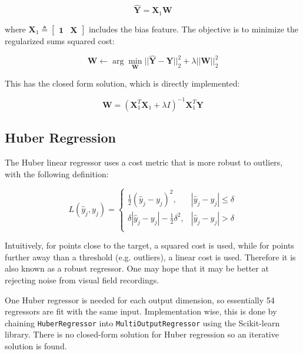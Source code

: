 \begin{equation}
\hat{\mathbf{Y}} = \mathbf{X}_1\mathbf{W}
\end{equation}

where $\mathbf{X}_1\triangleq\begin{bmatrix}\mathbf{1} & \mathbf{X} \end{bmatrix}$ includes the bias feature. The objective is to minimize the regularized sums squared cost:

\begin{equation}
\mathbf{W} \leftarrow \arg \min_{\mathbf{W}} ||\hat{\mathbf{Y}} - \mathbf{Y}||^2_2 + \lambda ||\mathbf{W}||^2_2
\end{equation}

This has the closed form solution, which is directly implemented:

\begin{equation}
\mathbf{W} = \left(
\mathbf{X}_1^T \mathbf{X}_1 + \lambda I
\right)^{-1}
\mathbf{X}_1^T \mathbf{Y}
\end{equation}

\subsection{Huber Regression}

The Huber linear regressor uses a cost metric that is more robust to outliers, with the following definition:

\begin{equation}
L(\hat{y}_j, y_j) = \left\{\begin{array}{lr}
\frac{1}{2}(\hat{y}_j - y_j)^2, & |\hat{y}_j - y_j| \leq \delta\\
\delta|\hat{y}_j - y_j| - \frac{1}{2} \delta^2, & |\hat{y}_j - y_j| > \delta\\
\end{array}
\right.
\end{equation}

Intuitively, for points close to the target, a squared cost is used, while for points further away than a threshold (e.g. outliers), a linear cost is used. Therefore it is also known as a robust regressor. One may hope that it may be better at rejecting noise from visual field recordings. 

One Huber regressor is needed for each output dimension, so essentially 54 regressors are fit with the same input. Implementation wise, this is done by chaining \verb|HuberRegressor| into \verb|MultiOutputRegressor| using the Scikit-learn library. \cite{scikit-learn} There is no closed-form solution for Huber regression so an iterative solution is found. 

